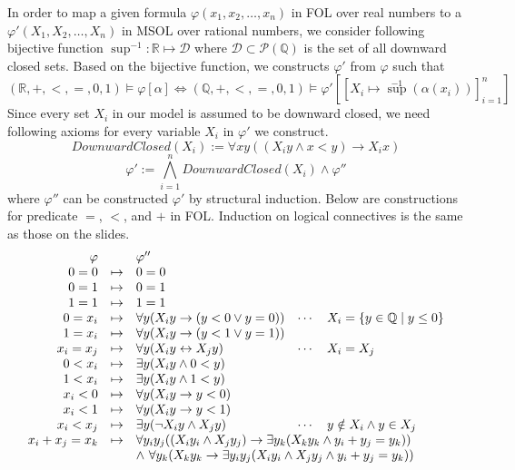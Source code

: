 \documentclass[11pt]{homework}
\begin{document}
In order to map a given formula \(\varphi (x_1, x_2,\dotsc,x_n)\) in FOL over real numbers to a \(\varphi'(X_1, X_2,\dotsc,X_n)\) in MSOL over rational numbers,
we consider following bijective function \(\sup^{-1} : \mathbb{R} \mapsto \mathcal D\) 
where \(\mathcal D \subset \mathcal P(\mathbb{Q})\) is the set of all downward closed sets.
Based on the bijective function,
we constructs \(\varphi'\) from \(\varphi\) such that
\[
(\mathbb{R}, +, <, =, 0, 1) \models \varphi[\alpha] \iff
(\mathbb{Q}, +, <, =, 0, 1) \models \varphi'[[X_i \mapsto {\sup}^{-1} (\alpha(x_i))]_{i=1}^{n}]
\]
Since every set \(X_i\) in our model is assumed to be downward closed,
we need following axioms for every variable \(X_i\) in \(\varphi'\) we construct.
\[
DownwardClosed(X_i) := \forall x y((X_i y \land x < y) \to X_i x)
\]
\[
\varphi' := \bigwedge_{i=1}^n DownwardClosed(X_i) \land \varphi''
\]
where \(\varphi''\) can be constructed \(\varphi'\) by structural induction.
Below are constructions for predicate \(=\), \(<\), and \(+\) in FOL.
Induction on logical connectives is the same as those on the slides.
\[
\begin{array}{rclcl}
	        \varphi &         & \varphi''                                &  \\
	          0 = 0 & \mapsto & 0 = 0                                    &  \\
	          0 = 1 & \mapsto & 0 = 1                                    &  \\
	          1 = 1 & \mapsto & 1 = 1                                    &  \\
	        0 = x_i & \mapsto & \forall y (X_i y \to (y < 0 \lor y = 0)) & \cdots & X_i = \{y \in \mathbb{Q} \mid y \leq 0\} \\
	        1 = x_i & \mapsto & \forall y (X_i y \to (y < 1 \lor y = 1)) &  \\
	      x_i = x_j & \mapsto & \forall y (X_i y \leftrightarrow X_j y)  & \cdots & X_i = X_j \\
	        0 < x_i & \mapsto & \exists y (X_i y \land 0 < y)            &  \\
	        1 < x_i & \mapsto & \exists y (X_i y \land 1 < y)            &  \\
	        x_i < 0 & \mapsto & \forall y (X_i y \to y < 0)              &  \\
	        x_i < 1 & \mapsto & \forall y (X_i y \to y < 1)              &  \\
	      x_i < x_j & \mapsto & \exists y (\neg X_i y \land X_j y)       & \cdots & y \notin X_i \land y \in X_j \\
	x_i + x_j = x_k & \mapsto & \multicolumn{3}{l}{\forall y_i y_j ((X_i y_i \land X_j y_j) \to \exists y_k(X_k y_k \land y_i + y_j = y_k))}       \\
	                &         & \multicolumn{3}{l}{\land\ \forall y_k (X_k y_k \to \exists y_i y_j (X_i y_i \land X_j y_j \land y_i + y_j = y_k))}
\end{array}
\]
\end{document}
